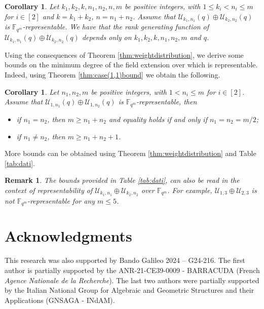 \documentclass[11pt]{amsart}
\newtheorem{corollary}[theorem]{Corollary}
\newtheorem{remark}[theorem]{Remark}
\newcommand{\mU}{\mathcal{U}}
\newcommand{\fqm}{\mathbb{F}_{q^m}}
\newcommand{\Fm}{\mathbb{F}_{q^m}}
\begin{document}
\begin{corollary}
    Let $k_1,k_2,k,n_1,n_2, n, m$ be positive integers, with $1\le k_i< n_i\le m$ for $i \in [2]$ and $k=k_1+k_2$, $n=n_1+n_2$.
Assume that $\mU_{k_1,n_1}(q)\oplus\mU_{k_2,n_2}(q)$ is $\Fm$-representable. We have that the rank generating function of $\mU_{k_1,n_1}(q)\oplus\mU_{k_2,n_2}(q)$ depends only on $k_1,k_2,k,n_1,n_2,m$ and $q$.
\end{corollary}

Using the consequences of Theorem \ref{thm:weightdistribution}, we derive some bounds on the minimum degree of the field extension over which is representable. Indeed, using Theorem \ref{thm:case(1,1)bound} we obtain the following.

\begin{corollary}
    Let $n_1,n_2, m$ be positive integers, with $1< n_i\le m$ for $i \in [2]$.
Assume that $\mU_{1,n_1}(q)\oplus\mU_{1,n_2}(q)$ is $\Fm$-representable, then 
    \begin{itemize}
        \item if $n_1=n_2$, then $m\geq n_1+n_2$ and equality holds if and only if $n_1=n_2=m/2$;
        \item if $n_1\ne n_2$, then $m\geq n_1+n_2+1$.
    \end{itemize}
\end{corollary}

More bounds can be obtained using Theorem \ref{thm:weightdistribution} and Table \ref{tab:dati}.

\begin{remark}
    The bounds provided in Table \ref{tab:dati}, can also be read in the context of representability of $\mathcal{U}_{k_1,n_1}\oplus\mathcal{U}_{k_2,n_2}$ over $\fqm$. For example, $\mathcal{U}_{1,3}\oplus\mathcal{U}_{2,3}$ is not $\fqm$-representable for any $m\leq 5$.  
\end{remark}


\bigskip

\section*{Acknowledgments}
This research was also supported by Bando Galileo 2024 – G24-216. The first author is partially supported by the ANR-21-CE39-0009 - BARRACUDA (French \emph{Agence Nationale de la Recherche}).
The last two authors were partially supported by the Italian National Group for Algebraic and Geometric Structures and their Applications (GNSAGA - INdAM).




\end{document}
